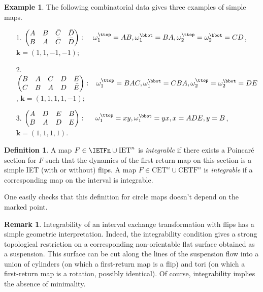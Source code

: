 \documentclass[12pt]{article}
\theoremstyle{definition}
\newtheorem{definition}{Definition}
\newtheorem*{remark}{Remark}
\newtheorem*{example}{Example}
\begin{document}
\begin{example}
The following combinatorial data gives three examples of simple maps.
\begin{itemize}
\item[1.]$\begin{pmatrix}
A&B&\bar{C}&\bar{D}\\
B&A&\bar{C}&\bar{D}
\end{pmatrix}
: \; \; \; \; \omega_1^{\ttop}=AB, \omega_1^{\bbot}=BA, \omega_2^{\ttop}=\omega_2^{\bbot}=CD$, $\boldsymbol{k}=(1,1,-1,-1)$;

\item[2.]$\begin{pmatrix}
B&A&C&{D}&\bar{E}\\
C&B&A&{D}&\bar{E}
\end{pmatrix}: \; \; \; \omega_1^{\ttop}=BAC, \omega_1^{\bbot}=CBA,  \omega_2^{\ttop}=\omega_2^{\bbot}=DE$, $\boldsymbol{k}=(1,1,1,1,-1)$;

\item[3.]$\begin{pmatrix}
A&D&E&B\\
B&A&D&E
\end{pmatrix}: \;\;\;\;\; \omega_1^{\ttop}=xy,\omega_1^{\bbot}=yx, x=ADE, y=B$, $\boldsymbol{k}=(1,1,1,1)$.
\end{itemize}
\end{example}


\begin{definition}
A map $F \in \IETFn \cup \mathrm{IET}^n$ is \emph{integrable} if there exists a Poincaré section for $F$ such that the dynamics of the first return map on this section is a simple IET (with or without) flips. 
A map $F \in \mathrm{CET}^n \cup \mathrm{CETF}^n$ is \emph{integrable} if a corresponding map on the interval is integrable.
\end{definition}

One easily checks that this definition for circle maps doesn't depend on the marked point. 

\begin{remark}
Integrability of an interval exchange transformation with flips has a simple geometric interpretation. Indeed, the integrability condition gives a strong topological restriction on a corresponding non-orientable flat surface obtained as a suspension. This surface can be cut along the lines of the suspension flow into a union of cylinders (on which a first-return map is a flip) and tori (on which a first-return map is a rotation, possibly identical). Of course, integrability implies the absence of minimality.
\end{remark}
\end{document}
